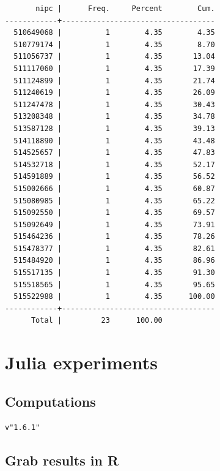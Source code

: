 \documentclass[
  12pt,
]{article}
\begin{document}
\begin{verbatim}
       nipc |      Freq.     Percent        Cum.
------------+-----------------------------------
  510649068 |          1        4.35        4.35
  510779174 |          1        4.35        8.70
  511056737 |          1        4.35       13.04
  511117060 |          1        4.35       17.39
  511124899 |          1        4.35       21.74
  511240619 |          1        4.35       26.09
  511247478 |          1        4.35       30.43
  513208348 |          1        4.35       34.78
  513587128 |          1        4.35       39.13
  514118890 |          1        4.35       43.48
  514525657 |          1        4.35       47.83
  514532718 |          1        4.35       52.17
  514591889 |          1        4.35       56.52
  515002666 |          1        4.35       60.87
  515080985 |          1        4.35       65.22
  515092550 |          1        4.35       69.57
  515092649 |          1        4.35       73.91
  515464236 |          1        4.35       78.26
  515478377 |          1        4.35       82.61
  515484920 |          1        4.35       86.96
  515517135 |          1        4.35       91.30
  515518565 |          1        4.35       95.65
  515522988 |          1        4.35      100.00
------------+-----------------------------------
      Total |         23      100.00
\end{verbatim}

\hypertarget{julia-experiments}{%
\section{Julia experiments}\label{julia-experiments}}

\hypertarget{computations}{%
\subsection{Computations}\label{computations}}

\begin{verbatim}
v"1.6.1"
\end{verbatim}

\hypertarget{grab-results-in-r}{%
\subsection{Grab results in R}\label{grab-results-in-r}}
\end{document}
